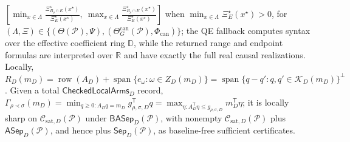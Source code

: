 \(\left[\min_{x\in\Lambda}\frac{\Xi_{B_\rho\cap E}^\star(x^\star)}{\Xi_E^\star(x^\star)},\ \max_{x\in\Lambda}\frac{\Xi_{B_\rho\cap E}^\star(x^\star)}{\Xi_E^\star(x^\star)}\right]\) when \(\min_{x\in\Lambda}\Xi_E^\star(x^\star)>0\), for \((\Lambda,\Xi)\in\{(\Theta(\mathcal P),\Psi),(\Theta_G^{\mathrm{can}}(\mathcal P),\Phi_{\mathrm{can}})\}\); the QE fallback computes syntax over the effective coefficient ring \(\mathbb D\), while the returned range and endpoint formulas are interpreted over \(\mathbb R\) and have exactly the full real causal realizations.  Locally, \(R_D(m_D)=\operatorname{row}(A_D)+\operatorname{span}\{e_\omega:\omega\in Z_D(m_D)\}=\operatorname{span}\{q-q':q,q'\in\mathcal K_D(m_D)\}^{\perp}\).  Given a total \(\mathsf{CheckedLocalArms}_D\) record, \(\Gamma_{\rho\prec\sigma}(m_D)=\min_{q\geq0:A_Dq=m_D}g_{\rho,\sigma,D}^{\mathsf T}q=\max_{\eta:A_D^{\mathsf T}\eta\leq g_{\rho,\sigma,D}}m_D^{\mathsf T}\eta\); it is locally sharp on \(\mathcal C_{\mathrm{sat},D}(\mathcal P)\) under \(\mathsf{BASep}_D(\mathcal P)\), with nonempty \(\mathcal C_{\mathrm{sat},D}(\mathcal P)\) plus \(\mathsf{ASep}_D(\mathcal P)\), and hence plus \(\mathsf{Sep}_D(\mathcal P)\), as baseline-free sufficient certificates.
